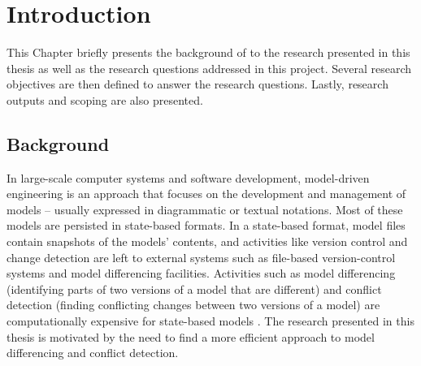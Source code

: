 \chapter{Introduction}
\label{ch:introduction}
This Chapter briefly presents the background of to the research presented in this thesis as well as the research questions addressed in this project. Several research objectives are then defined to answer the research questions. 
Lastly, research outputs and scoping are also presented. 

\section{Background}
\label{sec:background}
In large-scale computer systems and software development, model-driven engineering is an approach that focuses on the development and management of models -- usually expressed in diagrammatic or textual notations. Most of these models are persisted in state-based formats. In a state-based format, model files contain snapshots of the models' contents, and activities like version control and change detection are left to external systems such as file-based version-control systems and model differencing facilities. Activities such as model differencing (identifying parts of two versions of a model that are different) and conflict detection (finding conflicting changes between two versions of a model) are computationally expensive for state-based models \cite{Kolovos:2009:DMM:1564596.1564641}. The research presented in this thesis is motivated by the need to find a more efficient approach to model differencing and conflict detection.

